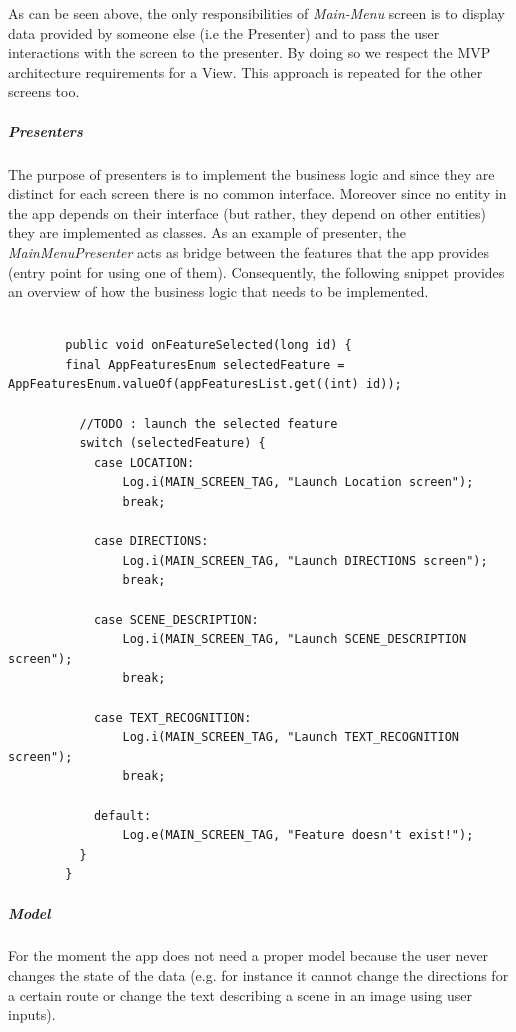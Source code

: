 \documentclass{article}[11]
\begin{document}
    As can be seen above, the only responsibilities of \emph{Main-Menu} screen is to display data provided by someone else (i.e the Presenter) and to pass the user interactions with the screen to the presenter. By doing so we respect the MVP architecture requirements for a View. This approach is repeated for the other screens too.
    
  \subparagraph{Presenters\\}
  	The purpose of presenters is to implement the business logic and since they are distinct for each screen there is no common interface. Moreover since no entity in the app depends on their interface (but rather, they depend on other entities) they are implemented as classes. As an example of presenter, the \emph{MainMenuPresenter} acts as bridge between the features that the app provides (entry point for using one of them). Consequently, the following snippet provides an overview of how the business logic that needs to be implemented.
  	
  	\begin{lstlisting}[caption = onFeatureSelected() mock]	
  	
  		public void onFeatureSelected(long id) {
    	final AppFeaturesEnum selectedFeature = AppFeaturesEnum.valueOf(appFeaturesList.get((int) id));

    	  //TODO : launch the selected feature
    	  switch (selectedFeature) {
      		case LOCATION:
        		Log.i(MAIN_SCREEN_TAG, "Launch Location screen");
        		break;

      		case DIRECTIONS:
       			Log.i(MAIN_SCREEN_TAG, "Launch DIRECTIONS screen");
        		break;

      		case SCENE_DESCRIPTION:
        		Log.i(MAIN_SCREEN_TAG, "Launch SCENE_DESCRIPTION screen");
        		break;

      		case TEXT_RECOGNITION:
        		Log.i(MAIN_SCREEN_TAG, "Launch TEXT_RECOGNITION screen");
        		break;
      
     		default:
        		Log.e(MAIN_SCREEN_TAG, "Feature doesn't exist!");
    	  }
  		}
  	\end{lstlisting}
  
  \subparagraph{Model\\}
  		For the moment the app does not need a proper model because the user never changes the state of the data (e.g. for instance it cannot change the directions for a certain route or change the text describing a scene in an image using user inputs).
\end{document}
